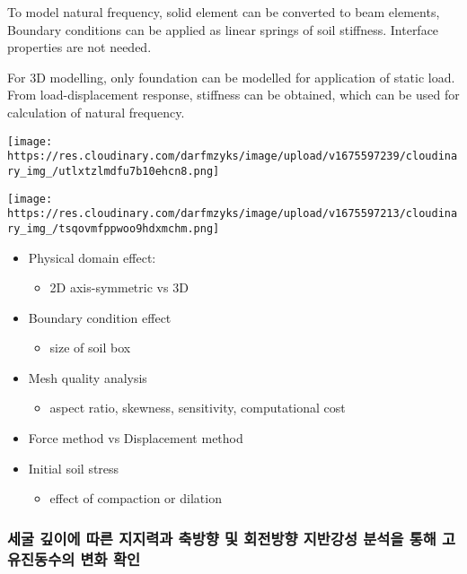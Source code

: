 \documentclass[
  letterpaper,
  DIV=11,
  numbers=noendperiod]{scrreprt}
\providecommand{\tightlist}{%
  \setlength{\itemsep}{0pt}\setlength{\parskip}{0pt}}\usepackage{longtable,booktabs,array}
\begin{document}
To model natural frequency, solid element can be converted to beam
elements, Boundary conditions can be applied as linear springs of soil
stiffness. Interface properties are not needed.

For 3D modelling, only foundation can be modelled for application of
static load. From load-displacement response, stiffness can be obtained,
which can be used for calculation of natural frequency.

\texttt{[image: https://res.cloudinary.com/darfmzyks/image/upload/v1675597239/cloudinary\_img\_/utlxtzlmdfu7b10ehcn8.png]}

\texttt{[image: https://res.cloudinary.com/darfmzyks/image/upload/v1675597213/cloudinary\_img\_/tsqovmfppwoo9hdxmchm.png]}

\begin{itemize}
\tightlist
\item
  Physical domain effect:

  \begin{itemize}
  \tightlist
  \item
    2D axis-symmetric vs 3D
  \end{itemize}
\item
  Boundary condition effect

  \begin{itemize}
  \tightlist
  \item
    size of soil box
  \end{itemize}
\item
  Mesh quality analysis

  \begin{itemize}
  \tightlist
  \item
    aspect ratio, skewness, sensitivity, computational cost
  \end{itemize}
\item
  Force method vs Displacement method
\item
  Initial soil stress

  \begin{itemize}
  \tightlist
  \item
    effect of compaction or dilation
  \end{itemize}
\end{itemize}

\hypertarget{uxc138uxad74-uxae4auxc774uxc5d0-uxb530uxb978-uxc9c0uxc9c0uxb825uxacfc-uxcd95uxbc29uxd5a5-uxbc0f-uxd68cuxc804uxbc29uxd5a5-uxc9c0uxbc18uxac15uxc131-uxbd84uxc11duxc744-uxd1b5uxd574-uxace0uxc720uxc9c4uxb3d9uxc218uxc758-uxbcc0uxd654-uxd655uxc778}{%
\subsubsection{세굴 깊이에 따른 지지력과 축방향 및 회전방향 지반강성
분석을 통해 고유진동수의 변화
확인}\label{uxc138uxad74-uxae4auxc774uxc5d0-uxb530uxb978-uxc9c0uxc9c0uxb825uxacfc-uxcd95uxbc29uxd5a5-uxbc0f-uxd68cuxc804uxbc29uxd5a5-uxc9c0uxbc18uxac15uxc131-uxbd84uxc11duxc744-uxd1b5uxd574-uxace0uxc720uxc9c4uxb3d9uxc218uxc758-uxbcc0uxd654-uxd655uxc778}}
\end{document}
